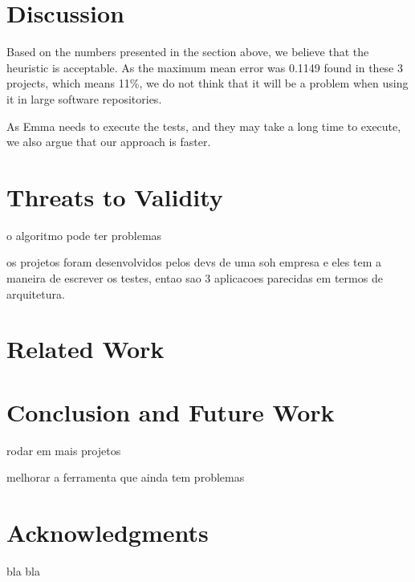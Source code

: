 \documentclass{sig-alternate}
\begin{document}
\section{Discussion}

Based on the numbers presented in the section above, we believe that the heuristic
is acceptable. As the maximum mean error was 0.1149 found in these 3 projects, which means 11\%, 
we do not think that it will be a problem when using it in large software repositories.


As Emma needs to execute the tests, and they may take a long time to execute, we also argue
that our approach is faster.

\section{Threats to Validity}

o algoritmo pode ter problemas

os projetos foram desenvolvidos pelos devs de uma soh empresa e eles tem a maneira de escrever
os testes, entao sao 3 aplicacoes parecidas em termos de arquitetura.

\section{Related Work}











\section{Conclusion and Future Work}

rodar em mais projetos

melhorar a ferramenta que ainda tem problemas

\section{Acknowledgments}

bla bla



\end{document}

